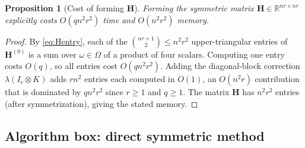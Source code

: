 \documentclass[12pt]{article}
\newtheorem{proposition}[theorem]{Proposition}
\theoremstyle{definition}
\newcommand{\R}{\mathbb{R}}
\begin{document}
\begin{proposition}[Cost of forming $\mathbf{H}$]\label{prop:formH}
Forming the symmetric matrix $\mathbf{H}\in\R^{nr\times nr}$ explicitly costs
$O(qn^2r^2)$ time and $O(n^2r^2)$ memory.
\end{proposition}

\begin{proof}
By \eqref{eq:Hentry}, each of the $\binom{nr+1}{2}\le n^2r^2$ upper-triangular entries of
$\mathbf{H}^{(0)}$ is a sum over $\omega\in\Omega$ of a product of four scalars. Computing one
entry costs $O(q)$, so all entries cost $O(qn^2r^2)$. Adding the diagonal-block correction
$\lambda(I_r\otimes K)$ adds $rn^2$ entries each computed in $O(1)$, an $O(n^2r)$ contribution
that is dominated by $qn^2r^2$ since $r\geq 1$ and $q\geq 1$.
The matrix $\mathbf{H}$ has $n^2r^2$ entries (after symmetrization), giving the stated memory.
\end{proof}

\subsection{Algorithm box: direct symmetric method}
\end{document}
